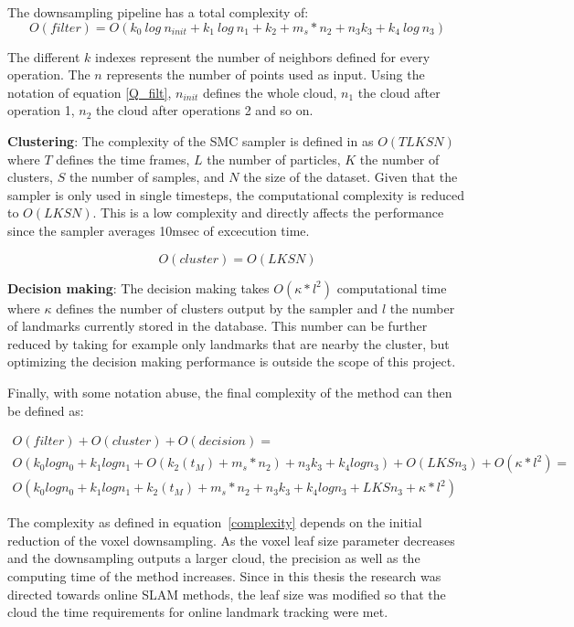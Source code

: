 \documentclass[twoside,hidelinks]{article}
\begin{document}
The downsampling pipeline has a total complexity of:
\begin{equation} \label{Q_filt}
O(filter) = O(k_{0}\ log\ n_{init} + k_{1}\ log\ n_{1} + k_{2}+ m_s*n_{2} + n_{3}k_{3} + k_{4}\ log\ n_{3} )
\end{equation}

The different $k$ indexes represent the number of neighbors defined for every operation. The $n$ represents the number of points used as input. Using the notation of equation \ref{Q_filt}, $n_{init}$ defines the whole cloud, $n_1$ the cloud after operation 1, $n_2$ the cloud after operations 2 and so on.

\textbf{Clustering}: The complexity of the SMC sampler is defined in \cite{smcddp} as $O(TLKSN)$ where $T$ defines the time frames, $L$ the number of particles, $K$ the number of clusters, $S$ the number of samples, and $N$ the size of the dataset. Given that the sampler is only used in single timesteps, the computational complexity is reduced to $ O(LKSN) $. This is a low complexity and directly affects the performance since the sampler averages 10msec of excecution time.

$$
O(cluster) = O(LKSN)
$$

\textbf{Decision making}: The decision making takes $ O(\kappa * l^2) $ computational time where $\kappa$ defines the number of clusters output by the sampler and $l$ the number of landmarks currently stored in the database. This number can be further reduced by taking for example only landmarks that are nearby the cluster, but optimizing the decision making performance is outside the scope of this project.


Finally, with some notation abuse, the final complexity of the method can then be defined as:

\begin{equation} \label{complexity}
\begin{split}
O(filter) + O(cluster) + O(decision) = \\
O(k_{0}logn_{0} + k_{1}logn_{1} + O(k_{2}(t_M)+ m_s*n_{2}) + n_{3}k_{3} + k_{4}logn_{3} ) + O(LKSn_3) + O(\kappa * l^2)=\\
O(k_{0}logn_{0} + k_{1}logn_{1} + k_{2}(t_M)+ m_s*n_{2} + n_{3}k_{3} + k_{4}logn_{3} + LKSn_3 + \kappa * l^2)
\end{split}
\end{equation}

The complexity as defined in equation~\ref{complexity} depends on the initial reduction of the voxel downsampling. As the voxel leaf size parameter decreases and the downsampling outputs a larger cloud, the precision as well as the computing time of the method increases. Since in this thesis the research was directed towards online SLAM methods, the leaf size was modified so that the cloud the time requirements for online landmark tracking were met.
\end{document}

